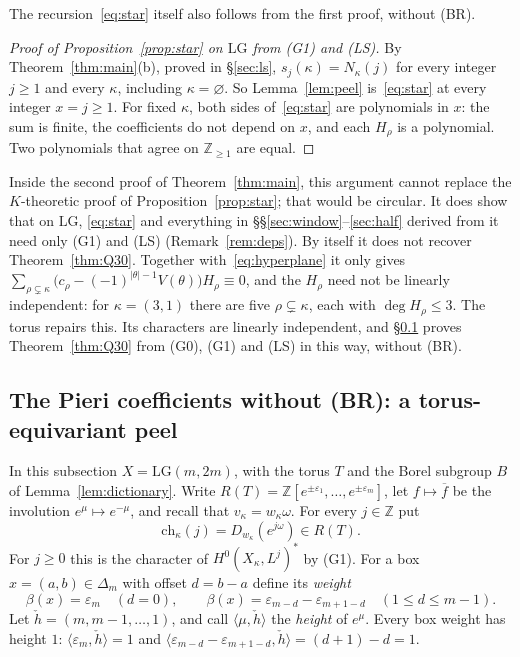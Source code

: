 \documentclass[11pt]{amsart}
\theoremstyle{definition}
\theoremstyle{remark}
\newcommand{\LG}{\mathrm{LG}}
\newcommand{\Z}{\mathbb{Z}}
\begin{document}
The recursion~\eqref{eq:star} itself also follows from the first proof, without (BR).

\begin{proof}[Proof of Proposition~\ref{prop:star} on $\LG$ from (G1) and (LS)]
By Theorem~\ref{thm:main}(b), proved in \S\ref{sec:ls}, $s_j(\kappa)=N_\kappa(j)$ for every
integer $j\ge1$ and every $\kappa$, including $\kappa=\varnothing$. So Lemma~\ref{lem:peel}
is~\eqref{eq:star} at every integer $x=j\ge1$. For fixed $\kappa$, both sides
of~\eqref{eq:star} are polynomials in $x$: the sum is finite, the coefficients do not depend on
$x$, and each $H_\rho$ is a polynomial. Two polynomials that agree on $\Z_{\ge1}$ are equal.
\end{proof}

Inside the second proof of Theorem~\ref{thm:main}, this argument cannot replace the
$K$-theoretic proof of Proposition~\ref{prop:star}; that would be circular. It does show that on $\LG$, \eqref{eq:star} and everything in
\S\S\ref{sec:window}--\ref{sec:half} derived from it need only (G1) and (LS)
(Remark~\ref{rem:deps}). By itself it does not recover Theorem~\ref{thm:Q30}. Together with~\eqref{eq:hyperplane}
it only gives $\sum_{\rho\subsetneq\kappa}\bigl(c_\rho-(-1)^{|\theta|-1}V(\theta)\bigr)H_\rho\equiv0$, and
the $H_\rho$ need not be linearly independent: for $\kappa=(3,1)$ there are five
$\rho\subsetneq\kappa$, each with $\deg H_\rho\le3$. The torus repairs this. Its characters
are linearly independent, and \S\ref{ssec:equivariant} proves Theorem~\ref{thm:Q30} from (G0), (G1) and (LS)
in this way, without (BR).

\subsection{The Pieri coefficients without (BR): a torus-equivariant peel}\label{ssec:equivariant}
In this subsection $X=\LG(m,2m)$, with the torus $T$ and the Borel subgroup $B$ of
Lemma~\ref{lem:dictionary}. Write $R(T)=\Z[e^{\pm\varepsilon_1},\dots,e^{\pm\varepsilon_m}]$, let
$f\mapsto\overline f$ be the involution $e^\mu\mapsto e^{-\mu}$, and recall that
$v_\kappa=w_\kappa\omega$. For every $j\in\Z$ put
\[ \mathrm{ch}_\kappa(j)=D_{w_\kappa}(e^{j\omega})\in R(T). \]
For $j\ge0$ this is the character of $H^0(X_\kappa,L^j)^*$ by (G1). For a box $x=(a,b)\in\Delta_m$
with offset $d=b-a$ define its \emph{weight}
\[ \beta(x)=\varepsilon_m\quad(d=0),\qquad \beta(x)=\varepsilon_{m-d}-\varepsilon_{m+1-d}\quad(1\le d\le m-1). \]
Let $\check h=(m,m-1,\dots,1)$, and call $\langle\mu,\check h\rangle$ the \emph{height} of $e^\mu$.
Every box weight has height $1$: $\langle\varepsilon_m,\check h\rangle=1$ and
$\langle\varepsilon_{m-d}-\varepsilon_{m+1-d},\check h\rangle=(d+1)-d=1$.
\end{document}
